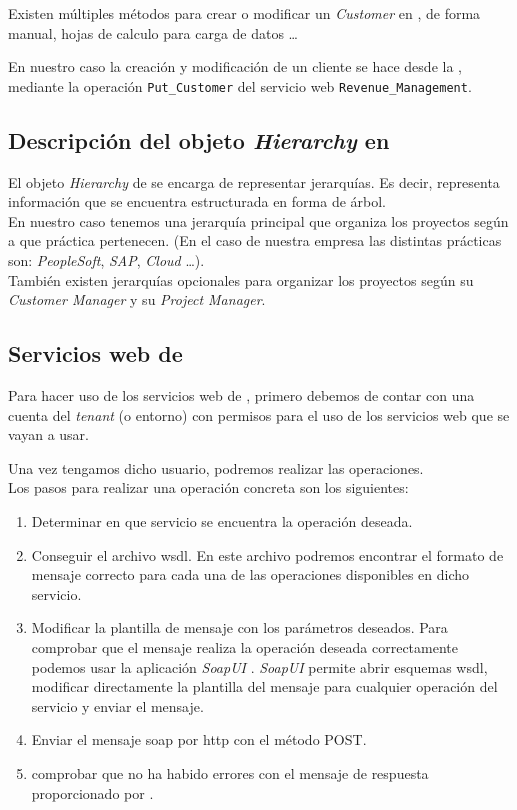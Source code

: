 Existen múltiples métodos para crear o modificar un \textit{Customer} en \wday{}, de forma manual, hojas de calculo para carga de datos \ldots

En nuestro caso la creación y modificación de un cliente se hace desde la \iface{}, 
mediante la operación \texttt{Put\_Customer} del servicio web \texttt{Revenue\_Management}.

\subsection{Descripción del objeto \textit{Hierarchy} en \wday{}}

El objeto \textit{Hierarchy} de \wday{} se encarga de representar jerarquías.
Es decir, representa información que se encuentra estructurada en forma de árbol.\\

En nuestro caso tenemos una jerarquía principal que organiza los proyectos según a que práctica pertenecen. 
(En el caso de nuestra empresa las distintas prácticas son: \textit{PeopleSoft}, \textit{SAP}, \textit{Cloud} \ldots).\\

También existen jerarquías opcionales para organizar los proyectos según su \textit{Customer Manager} y su \textit{Project Manager}.

\subsection{Servicios web de \wday{}}

Para hacer uso de los servicios web de \wday{}, primero debemos de contar con una cuenta del \textit{tenant} (o entorno) con permisos para el uso de los servicios web que se vayan a usar.

Una vez tengamos dicho usuario, podremos realizar las operaciones.\\

Los pasos para realizar una operación concreta son los siguientes:

\begin{enumerate}
	\item Determinar en que servicio se encuentra la operación deseada.
	\item Conseguir el archivo \acrshort{wsdl}. En este archivo podremos encontrar el formato de mensaje correcto para cada una de las operaciones disponibles en dicho servicio.
	\item Modificar la plantilla de mensaje con los parámetros deseados. 
	Para comprobar que el mensaje realiza la operación deseada correctamente podemos usar la aplicación \textit{SoapUI} \cite{soapui}.
	\textit{SoapUI} permite abrir esquemas \acrshort{wsdl}, modificar directamente la plantilla del mensaje para cualquier operación del servicio y enviar el mensaje.
	\item Enviar el mensaje \acrshort{soap} por \acrshort{http} con el método POST.
	\item comprobar que no ha habido errores con el mensaje de respuesta proporcionado por \wday.
\end{enumerate}


